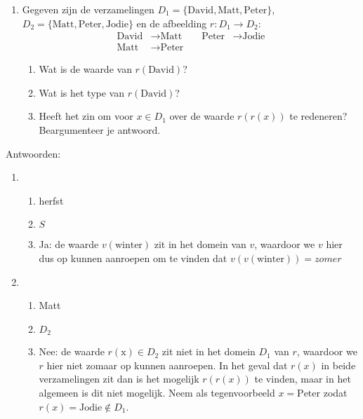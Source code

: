 \begin{answer}
\begin{enumerate}[label=\textbf{\alph*.}]
  \item Gegeven zijn de verzamelingen $D_{1} = \{ \text{David}, \text{Matt}, \text{Peter} \}$, $D_{2} = \{ \text{Matt}, \text{Peter}, \text{Jodie} \}$ en de afbeelding $r : D_{1} \to D_{2}$:
  \begin{equation*}
  \begin{aligned}
    \text{David} &\longrightarrow \text{Matt}\quad\quad
    \text{Peter} &\longrightarrow \text{Jodie}\\
    \text{Matt} &\longrightarrow \text{Peter}
  \end{aligned}
  \end{equation*}
  \begin{enumerate}[label=\textbf{\alph*.}]
      \item Wat is de waarde van $r(\text{David})$?
      \item Wat is het type van $r(\text{David})$?
      \item Heeft het zin om voor $x \in D_{1}$ over de waarde $r(r(x))$ te redeneren?\\ Beargumenteer je antwoord.
  \end{enumerate}
  \end{enumerate}
Antwoorden:
  \begin{enumerate}[label=\textbf{\alph*.}]
    \item \begin{enumerate}[label=\textbf{\alph*.}]
             \item herfst
             \item $S$
             \item Ja: de waarde $v(\text{winter})$ zit in het domein van $v$, waardoor we $v$ hier dus op kunnen aanroepen om te vinden dat $v(v(\text{winter})) = zomer$
          \end{enumerate}
    \item \begin{enumerate}[label=\textbf{\alph*.}]
             \item Matt
             \item $D_{2}$
             \item Nee: de waarde $r(\text{x}) \in D_{2}$ zit niet in het domein $D_{1}$ van $r$, waardoor we $r$ hier niet zomaar op kunnen aanroepen. In het geval dat $r(x)$ in beide verzamelingen zit dan is het mogelijk $r(r(x))$ te vinden, maar in het algemeen is dit niet mogelijk. Neem als tegenvoorbeeld $x = \text{Peter}$ zodat $r(x) = \text{Jodie} \not\in D_{1}$.
          \end{enumerate}
  \end{enumerate}
\end{answer}

